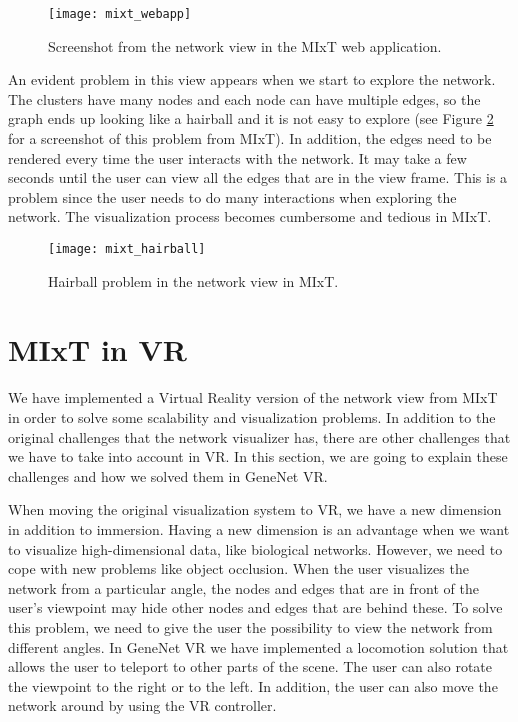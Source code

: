 \begin{figure}[h!]
    \setlength{\tempheight}{15ex}
    \centering
    \texttt{[image: mixt\_webapp]}
    \caption{Screenshot from the network view in the MIxT web application.}
    \label{fig:mixt_webapp}
\end{figure}

An evident problem in this view appears when we start to explore the network. The clusters have many nodes and each node can have multiple edges, so the graph ends up looking like a hairball and it is not easy to explore (see Figure \ref{fig:mixt_hairball} for a screenshot of this problem from MIxT). In addition, the edges need to be rendered every time the user interacts with the network. It may take a few seconds until the user can view all the edges that are in the view frame. This is a problem since the user needs to do many interactions when exploring the network. The visualization process becomes cumbersome and tedious in MIxT.

\begin{figure}[h!]
    \setlength{\tempheight}{15ex}
    \centering
    \texttt{[image: mixt\_hairball]}
    \caption{Hairball problem in the network view in MIxT.}
    \label{fig:mixt_hairball}
\end{figure}

\section{MIxT in VR}
We have implemented a Virtual Reality version of the network view from MIxT in order to solve some scalability and visualization problems. In addition to the original challenges that the network visualizer has, there are other challenges that we have to take into account in VR. In this section, we are going to explain these challenges and how we solved them in GeneNet VR.

When moving the original visualization system to VR, we have a new dimension in addition to immersion. Having a new dimension is an advantage when we want to visualize high-dimensional data, like biological networks. However, we need to cope with new problems like object occlusion. When the user visualizes the network from a particular angle, the nodes and edges that are in front of the user's viewpoint may hide other nodes and edges that are behind these. To solve this problem, we need to give the user the possibility to view the network from different angles. In GeneNet VR we have implemented a locomotion solution that allows the user to teleport to other parts of the scene. The user can also rotate the viewpoint to the right or to the left. In addition, the user can also move the network around by using the VR controller.

